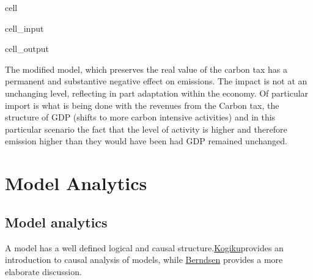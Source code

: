 \documentclass[letterpaper,10pt,english]{jupyterBook}
\begin{document}
\begin{sphinxuseclass}{cell}\begin{sphinxVerbatimInput}

\begin{sphinxuseclass}{cell_input}
\begin{sphinxVerbatim}[commandchars=\\\{\}]
\PYG{p}{[}\PYG{p}{]}
\end{sphinxVerbatim}

\end{sphinxuseclass}\end{sphinxVerbatimInput}
\begin{sphinxVerbatimOutput}

\begin{sphinxuseclass}{cell_output}
\noindent{}

\end{sphinxuseclass}\end{sphinxVerbatimOutput}

\end{sphinxuseclass}
\sphinxAtStartPar
The modified model, which preserves the real value of the carbon tax has a permanent and substantive negative effect on emissions. The impact is not at an unchanging level, reflecting in part adaptation within the economy. Of particular import is what is being done with the revenues from the Carbon tax, the structure of GDP (shifts to more carbon intensive activities) and in this particular scenario the fact that the level of activity is higher and therefore emission higher than they would have been had GDP remained unchanged.

\sphinxstepscope


\part{Model Analytics}

\sphinxstepscope


\chapter{Model analytics}
\label{\detokenize{content/06_ModelAnalytics/ModelStructure:model-analytics}}\label{\detokenize{content/06_ModelAnalytics/ModelStructure::doc}}
\sphinxAtStartPar
A model has a well defined logical and causal structure.\hyperlink{cite.content/99_BackMatter/References:id4}{Kogiku}provides an introduction to causal analysis of models, while \hyperlink{cite.content/99_BackMatter/References:id2}{Berndsen} provides a more elaborate discussion.
\end{document}
